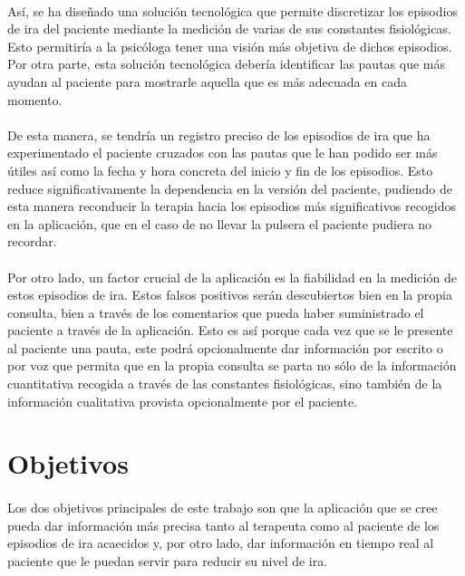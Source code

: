 \paragraph{}
Así, se ha diseñado una solución tecnológica que permite discretizar los episodios de ira del paciente mediante la medición de varias de sus constantes fisiológicas. Esto permitiría a la psicóloga tener una visión más objetiva de dichos episodios. Por otra parte, esta solución tecnológica debería identificar las pautas que más ayudan al paciente para mostrarle aquella que es más adecuada en cada momento.

\paragraph{}
De esta manera, se tendría un registro preciso de los episodios de ira que ha experimentado el paciente cruzados con las pautas que le han podido ser más útiles así como la fecha y hora concreta del inicio y fin de los episodios. Esto reduce significativamente la dependencia en la versión del paciente, pudiendo de esta manera reconducir la terapia hacia los episodios más significativos recogidos en la aplicación, que en el caso de no llevar la pulsera el paciente pudiera no recordar.

\paragraph{}
Por otro lado, un factor crucial de la aplicación es la fiabilidad en la medición de estos episodios de ira. Estos falsos positivos serán descubiertos bien en la propia consulta, bien a través de los comentarios que pueda haber suministrado el paciente a través de la aplicación. Esto es así porque cada vez que se le presente al paciente una pauta, este podrá opcionalmente dar información por escrito o por voz que permita que en la propia consulta se parta no sólo de la información cuantitativa recogida a través de las constantes fisiológicas, sino también de la información cualitativa provista opcionalmente por el paciente.


\section{Objetivos}

\paragraph{}
Los dos objetivos principales de este trabajo son que la aplicación que se cree pueda dar información más precisa tanto al terapeuta como al paciente de los episodios de ira acaecidos y, por otro lado, dar información en tiempo real al paciente que le puedan servir para reducir su nivel de ira.

